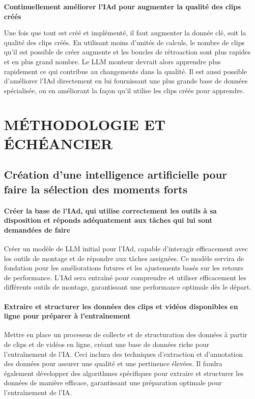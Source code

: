 \documentclass[livre]{udes-genie-these}
\begin{document}
{{\textbf{Continuellement améliorer l'IAd pour augmenter la qualité des clips créés}

Une fois que tout est créé et implémenté, il faut augmenter la donnée clé, soit la qualité des clips créés. En utilisant moins d'unités de calculs, le nombre de clips qu'il est possible de créer augmente et les boucles de rétroaction sont plus rapides et en plus grand nombre. Le LLM monteur devrait alors apprendre plus rapidement ce qui contribue au changements dans la qualité. Il est aussi possible d'améliorer l'IAd directement en lui fournissant une plus grande base de données spécialisée, ou en améliorant la façon qu'il utilise les clips créés pour apprendre.



\chapter{MÉTHODOLOGIE ET ÉCHÉANCIER}
\section{Création d'une intelligence artificielle pour faire la sélection des moments forts}
\subsubsection{Créer la base de l'IAd, qui utilise correctement les outils à sa disposition et réponds adéquatement aux tâches qui lui sont demandées de faire}
Créer un modèle de LLM initial pour l'IAd, capable d'interagir efficacement avec les outils de montage et de répondre aux tâches assignées. Ce modèle servira de fondation pour les améliorations futures et les ajustements basés sur les retours de performance. L'IAd sera entraîné pour comprendre et utiliser efficacement les différents outils de montage, garantissant une performance optimale dès le départ.

\subsubsection{Extraire et structurer les données des clips et vidéos disponibles en ligne pour préparer à l'entraînement}
Mettre en place un processus de collecte et de structuration des données à partir de clips et de vidéos en ligne, créant une base de données riche pour l'entraînement de l'IA. Ceci inclura des techniques d'extraction et d'annotation des données pour assurer une qualité et une pertinence élevées. Il faudra également développer des algorithmes spécifiques pour extraire et structurer les données de manière efficace, garantissant une préparation optimale pour l'entraînement de l'IA.

}}
\end{document}
